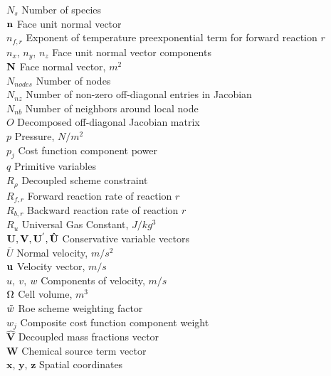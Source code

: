 \begin{tabbing}
  $N_s$ \> Number of species \\
  $\mathbf{n}$ \> Face unit normal vector \\
  $n_{f,r}$ \> Exponent of temperature preexponential term for forward reaction $r$ \\
  $n_x$, $n_y$, $n_z$ \> Face unit normal vector components \\
  $\mathbf{N}$ \> Face normal vector, $m^2$ \\
  $N_{nodes}$ \> Number of nodes \\
  $N_{nz}$ \> Number of non-zero off-diagonal entries in Jacobian \\
  $N_{nb}$ \> Number of neighbors around local node \\
  $O$ \> Decomposed off-diagonal Jacobian matrix \\
  $p$ \> Pressure, $N/m^2$ \\
  $p_j$ \> Cost function component power \\
  $q$ \> Primitive variables \\
  $R_\rho$ \> Decoupled scheme constraint \\
  $R_{f,r}$ \> Forward reaction rate of reaction $r$ \\
  $R_{b,r}$ \> Backward reaction rate of reaction $r$ \\
  $R_u$ \> Universal Gas Constant, $J/kg^3$ \\
  $\mathbf U,\mathbf V, \mathbf U^{'},\mathbf{\hat{U}}$ \> Conservative variable vectors \\
  $\overline{U}$ \> Normal velocity, $m/s^2$ \\
  $\mathbf u$ \> Velocity vector, $m/s$ \\
  $u,\ v,\ w$ \> Components of velocity, $m/s$ \\
  $\Omega$ \> Cell volume, $m^3$ \\
  $\tilde{w}$ \> Roe scheme weighting factor \\
  $w_j$ \> Composite cost function component weight \\
  $\mathbf{\hat{V}}$ \>  Decoupled mass fractions vector \\
  $\mathbf{W}$ \> Chemical source term vector \\
  $\mathbf{x}$, $\mathbf{y}$, $\mathbf{z}$ \> Spatial coordinates \\
 \end{tabbing}

